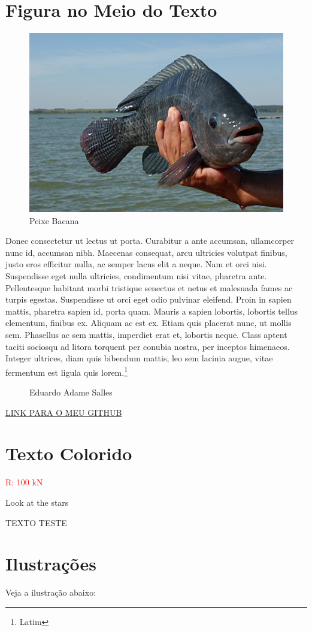 \documentclass[12pt,a4paper]{article}
\begin{document}
\section{Figura no Meio do Texto}
\begin{figure}
\includegraphics[width=.3\textwidth]{peixe.jpg}
\caption{Peixe Bacana}
\end{figure}
Donec consectetur ut lectus ut porta. Curabitur a ante accumsan, ullamcorper nunc id, accumsan nibh. Maecenas consequat, arcu ultricies volutpat finibus, justo eros efficitur nulla, ac semper lacus elit a neque. Nam et orci nisi. Suspendisse eget nulla ultricies, condimentum nisi vitae, pharetra ante. Pellentesque habitant morbi tristique senectus et netus et malesuada fames ac turpis egestas.
Suspendisse ut orci eget odio pulvinar eleifend. Proin in sapien mattis, pharetra sapien id, porta quam. Mauris a sapien lobortis, lobortis tellus elementum, finibus ex. Aliquam ac est ex. Etiam quis placerat nunc, ut mollis sem. Phasellus ac sem mattis, imperdiet erat et, lobortis neque. Class aptent taciti sociosqu ad litora torquent per conubia nostra, per inceptos himenaeos. Integer ultrices, diam quis bibendum mattis, leo sem lacinia augue, vitae fermentum est ligula quis lorem.\footnote{Latim}

\begin{figure}[!b]
{\calligra Eduardo Adame Salles}
\end{figure}
\href{https://github.com/adamesalles}{LINK PARA O MEU GITHUB}

\newpage
\section{Texto Colorido}
\textcolor{red}{R: 100 kN} 

\textcolor{yellow!70!cyan}{Look at the stars} 

\textcolor{airforceblue}{TEXTO TESTE}

\section{Ilustrações}
Veja a ilustração abaixo:
\begin{figure}[!h]
\centering
{}
\end{figure}
\end{document}
